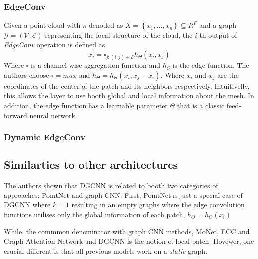 \documentclass[twocolumn,showpacs,
  nofootinbib,aps,superscriptaddress,
  eqsecnum,prd,notitlepage,showkeys,10pt]{article}
\begin{document}
\subsubsection{EdgeConv}
Given a point cloud with $n$ denoded as $X=\left\{x_{1}, \ldots, x_{n}\right\} \subseteq R^{F}$ and a graph $\mathcal{G}=(\mathcal{V}, \mathcal{E})$ representing the local structure of the cloud, the $i$-th output of \emph{EdgeConv} operation is defined as
\begin{equation}
  x_{i}^{\prime}=\square_{j :(i, j) \in \mathcal{E}} h_{\Theta}\left(x_{i}, x_{j}\right)
  \end{equation}
Where $\square$ is a channel wise aggregation function and $h_{\Theta}$ is the edge function. The authors choose $\square=max$ and $h_{\Theta} = h_{\Theta}(x_i, x_j - x_i)$. Where $x_i$ and $x_j$ are the coordinates of the center of the patch and its neighbors respectively. Intuitivelly, this allows the layer to use booth global and local information about the mesh. In addition, the edge function has a learnable parameter $\Theta$ that is a classic feed-forward neural network. 
\subsubsection{Dynamic EdgeConv}
\subsection{Similarties to other architectures}


The authors shown that DGCNN is related to booth two categories of approaches: PointNet and graph CNN.
First, PointNet is just a special case of DGCNN where $k=1$ resulting in an empty graphs where the edge convolution functions utilises only the global information of each patch, $h_{\Theta} = h_{\Theta}(x_i)$

While, the commmon denominator with graph CNN methods, MoNet, ECC and Graph Attention Network and DGCNN is the notion of local patch. Hovewer, one crucial different is that all previous models work on a \emph{static} graph.
\end{document}

